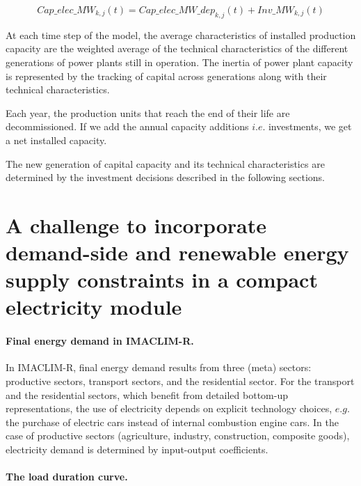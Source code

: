 \begin{dmath}
    Cap\_elec\_MW_{k,j}(t) = Cap\_elec\_MW\_dep_{k,j}(t) + Inv\_MW_{k,j}(t)
    \label{eqn:Cap_elec}
\end{dmath}




At each time step of the model, the average characteristics of installed production capacity are the weighted average of the technical characteristics of the different generations of power plants still in operation.
The inertia of power plant capacity is represented by the tracking of capital across generations along with their technical characteristics.

Each year, the production units that reach the end of their life are decommissioned.
If we add the annual capacity additions $i.e.$ investments, we get a net installed capacity.

The new generation of capital capacity and its technical characteristics are determined by the investment decisions described in the following sections.
\section{A challenge to incorporate demand-side and renewable energy supply constraints in a compact electricity module}

\paragraph{Final energy demand in IMACLIM-R.}

In IMACLIM-R, final energy demand results from three (meta) sectors: productive sectors, transport sectors, and the residential sector. For the transport and the residential sectors, which benefit from detailed bottom-up representations, the use of electricity depends on explicit technology choices, $e.g.$ the purchase of electric cars instead of internal combustion engine cars. In the case of productive sectors (agriculture, industry, construction, composite goods), electricity demand is determined by input-output coefficients.

\paragraph{The load duration curve.}


